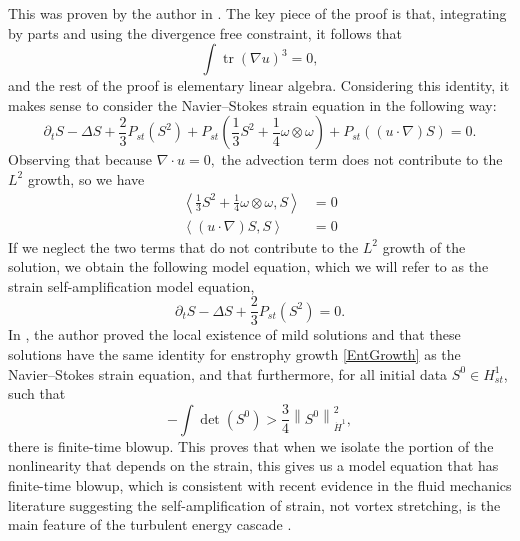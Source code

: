 \documentclass[11pt]{article}
\theoremstyle{plain}
\theoremstyle{remark}
\numberwithin{equation}{section}
\DeclareMathOperator*{\tr}{tr}
\begin{document}
This was proven by the author in \cite{MillerStrainModel}. The key piece of the proof is that, integrating by parts and using the divergence free constraint, it follows that
\begin{equation}
    \int\tr\left(\nabla u\right)^3=0,
\end{equation}
and the rest of the proof is elementary linear algebra.
Considering this identity, it makes sense to consider the Navier--Stokes strain equation in the following way:
\begin{equation}
    \partial_t S-\Delta S+\frac{2}{3}P_{st}\left(S^2\right)
    +P_{st}\left(\frac{1}{3}S^2
    +\frac{1}{4}\omega\otimes\omega\right)
    +P_{st}\left((u\cdot\nabla)S\right)=0.
\end{equation}
Observing that because $\nabla\cdot u=0,$ the advection term does not contribute to the $L^2$ growth, so we have
\begin{align}
    \left<\frac{1}{3}S^2+\frac{1}{4}\omega\otimes\omega,
    S\right>&=0 \\
    \left<(u\cdot\nabla)S,S\right>&=0 
\end{align}
If we neglect the two terms that do not contribute to the $L^2$ growth of the solution, we obtain the following model equation, which we will refer to as the strain self-amplification model equation,
\begin{equation} \label{StrainModel}
    \partial_t S -\Delta S +
    \frac{2}{3}P_{st}\left(S^2\right)=0.
\end{equation}
In \cite{MillerStrainModel}, the author proved the local existence of mild solutions and that these solutions have the same identity for enstrophy growth \eqref{EntGrowth} as the Navier--Stokes strain equation, and that furthermore, for all initial data
$S^0\in H^1_{st}$, such that
\begin{equation}
    -\int\det\left(S^0\right)>
    \frac{3}{4}\left\|S^0\right\|_{\dot{H}^1}^2,
\end{equation}
there is finite-time blowup.
This proves that when we isolate the portion of the nonlinearity that depends on the strain, this gives us a model equation that has finite-time blowup, which is consistent with recent evidence in the fluid mechanics literature suggesting the self-amplification of strain, not vortex stretching, is the main feature of the turbulent energy cascade \cite{CarboneBragg}.
\end{document}
